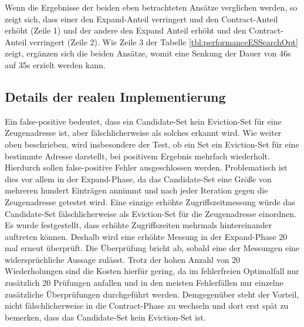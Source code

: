 Wenn die Ergebnisse der beiden eben betrachteten Ansätze verglichen werden, so zeigt sich, dass einer den Expand-Anteil verringert und den Contract-Anteil erhöht (Zeile 1) und der andere den Expand Anteil erhöht und den Contract-Anteil verringert (Zeile 2).
Wie Zeile 3 der Tabelle \ref{tbl:performanceESSearchOpt} zeigt, ergänzen sich die beiden Ansätze, womit eine Senkung der Dauer von 46s auf 35s erzielt werden kann.




\subsection{Details der realen Implementierung}

Ein false-positive bedeutet, dass ein Candidate-Set kein Eviction-Set für eine Zeugenadresse ist, aber fälschlicherweise als solches erkannt wird.
Wie weiter oben beschrieben, wird insbesondere der Test, ob ein Set ein Eviction-Set für eine bestimmte Adresse darstellt, bei positivem Ergebnis mehrfach wiederholt. Hierdurch sollen false-positive Fehler ausgeschlossen werden. 
Problematisch ist dies vor allem in der Expand-Phase, da das Candidate-Set eine Größe von mehreren hundert Einträgen annimmt und nach jeder Iteration gegen die Zeugenadresse getestet wird. 
Eine einzige erhöhte Zugriffszeitmessung würde das Candidate-Set fälschlicherweise als Eviction-Set für die Zeugenadresse einordnen. 
Es wurde festgestellt, dass erhöhte Zugriffszeiten mehrmals hintereinander auftreten können. Deshalb wird eine erhöhte Messung in der Expand-Phase 20 mal erneut überprüft. 
Die Überprüfung bricht ab, sobald eine der Messungen eine widersprüchliche Aussage zulässt.
Trotz der hohen Anzahl von 20 Wiederholungen sind die Kosten hierfür gering, da im fehlerfreien Optimalfall nur zusätzlich 20 Prüfungen anfallen und in den meisten Fehlerfällen nur einzelne zusätzliche Überprüfungen durchgeführt werden. 
Demgegenüber steht der Vorteil, nicht fälschlicherweise in die Contract-Phase zu wechseln und dort erst spät zu bemerken, dass das Candidate-Set kein Eviction-Set ist.

